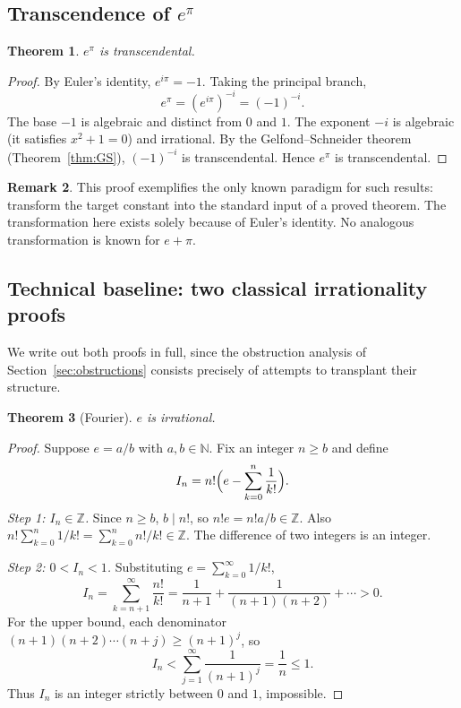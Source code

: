 \documentclass[11pt]{amsart}
\newtheorem{theorem}{Theorem}[section]
\theoremstyle{definition}
\newtheorem{remark}[theorem]{Remark}
\theoremstyle{remark}
\numberwithin{equation}{section}
\newcommand{\Z}{\mathbb{Z}}
\newcommand{\N}{\mathbb{N}}
\newcommand{\ee}{e}
\begin{document}
\subsection{Transcendence of \texorpdfstring{$e^\pi$}{e\^{}pi}}

\begin{theorem}\label{thm:epi}
$e^\pi$ is transcendental.
\end{theorem}

\begin{proof}
By Euler's identity, $\ee^{i\pi}=-1$. Taking the principal branch,
\[
\ee^\pi=(\ee^{i\pi})^{-i}=(-1)^{-i}.
\]
The base $-1$ is algebraic and distinct from $0$ and $1$. The exponent $-i$ is algebraic (it satisfies $x^2+1=0$) and irrational. By the Gelfond--Schneider theorem (Theorem~\ref{thm:GS}), $(-1)^{-i}$ is transcendental. Hence $\ee^\pi$ is transcendental.
\end{proof}

\begin{remark}
This proof exemplifies the only known paradigm for such results: transform the target constant into the standard input of a proved theorem. The transformation here exists solely because of Euler's identity. No analogous transformation is known for $e+\pi$.
\end{remark}

\subsection{Technical baseline: two classical irrationality proofs}

We write out both proofs in full, since the obstruction analysis of Section~\ref{sec:obstructions} consists precisely of attempts to transplant their structure.

\begin{theorem}[Fourier]\label{thm:fourier}
$\ee$ is irrational.
\end{theorem}

\begin{proof}
Suppose $\ee=a/b$ with $a,b\in\N$. Fix an integer $n\ge b$ and define
\[
I_n=n!\Bigl(\ee-\sum_{k=0}^{n}\frac{1}{k!}\Bigr).
\]
\emph{Step 1: $I_n\in\Z$.} Since $n\ge b$, $b\mid n!$, so $n!\ee=n!a/b\in\Z$. Also $n!\sum_{k=0}^n 1/k!=\sum_{k=0}^n n!/k!\in\Z$. The difference of two integers is an integer.

\emph{Step 2: $0<I_n<1$.} Substituting $\ee=\sum_{k=0}^\infty 1/k!$,
\[
I_n=\sum_{k=n+1}^{\infty}\frac{n!}{k!}=\frac{1}{n+1}+\frac{1}{(n+1)(n+2)}+\cdots>0.
\]
For the upper bound, each denominator $(n+1)(n+2)\cdots(n+j)\ge(n+1)^j$, so
\[
I_n<\sum_{j=1}^{\infty}\frac{1}{(n+1)^j}=\frac{1}{n}\le 1.
\]
Thus $I_n$ is an integer strictly between $0$ and $1$, impossible.
\end{proof}
\end{document}
